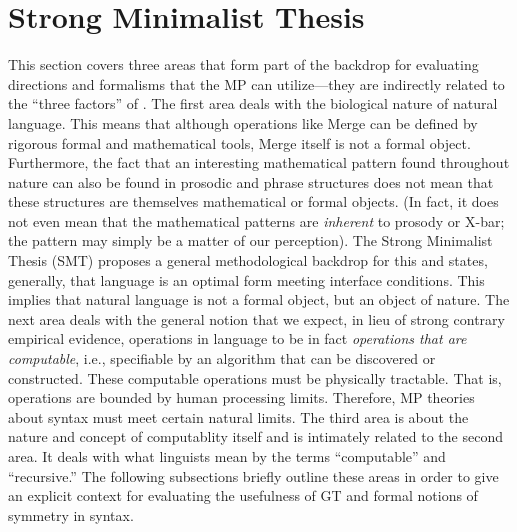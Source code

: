 \documentclass[11pt,twoside]{article}
\begin{document}
\section{Strong Minimalist Thesis}
This section covers three areas that form part of the backdrop for evaluating directions and formalisms that the MP can utilize---they are indirectly related to the ``three factors'' of \cite{chomsky05threefactors}. The first area deals with the biological nature of natural language. This means that although operations like Merge can be defined by rigorous formal and mathematical tools, Merge itself is not a formal object. Furthermore, the fact that an interesting mathematical pattern found throughout nature can also be found in prosodic and phrase structures does not mean that these structures are themselves mathematical or formal objects. (In fact, it does not even mean that the mathematical patterns are \textsl{inherent} to prosody or X-bar; the pattern may simply be a matter of our perception). The Strong Minimalist Thesis (SMT) proposes a general methodological backdrop for this and states, generally, that language is an optimal form meeting interface conditions. This implies that natural language is not a formal object, but an object of nature. The next area deals with the general notion that we expect, in lieu of strong contrary empirical evidence, operations in language to be in fact \textsl{operations that are computable}, i.e., specifiable by an algorithm that can be discovered or constructed. These computable operations must be physically tractable. That is, operations are bounded by human processing limits. Therefore, MP theories about syntax must meet certain natural limits. The third area is about the nature and concept of computablity itself and is intimately related to the second area. It deals with what linguists mean by the terms ``computable'' and ``recursive.'' The following subsections briefly outline these areas in order to give an explicit context for evaluating the usefulness of GT and formal notions of symmetry in syntax.  
\end{document}
